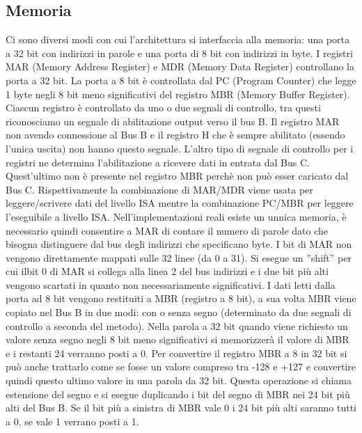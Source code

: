 \subsection{Memoria}
Ci sono diversi modi con cui l'architettura si interfaccia alla memoria: una porta a 32 bit con indirizzi in parole e una porta di 8 bit con indirizzi in byte. I registri MAR (Memory Address Register) e MDR (Memory Data Register) controllano la porta a 32 bit. La porta a 8 bit è controllata dal PC (Program Counter) che legge 1 byte negli 8 bit meno significativi del registro MBR (Memory Buffer Register).
Ciascun registro è controllato da uno o due segnali di controllo, tra questi riconosciamo un segnale di abilitazione output verso il bus B. Il registro MAR non avendo connessione al Bus B e il registro H che è sempre abilitato (essendo l'unica uscita) non hanno questo segnale. L'altro tipo di segnale di controllo per i registri ne determina l'abilitazione a ricevere dati in entrata dal Bus C. Quest'ultimo non è presente nel registro MBR perchè non può esser caricato dal Bus C. Rispettivamente la combinazione di MAR/MDR viene usata per leggere/scrivere dati del livello ISA mentre la combinazione PC/MBR per leggere l'eseguibile a livello ISA. Nell'implementazioni reali esiste un unnica memoria, è necessario quindi consentire a MAR di contare il numero di parole dato che bisogna distinguere dal bus degli indirizzi che specificano byte. I bit di MAR non vengono direttamente mappati sulle 32 linee (da 0 a 31). Si esegue un ''shift'' per cui ilbit 0 di MAR si collega alla linea 2 del bus indirizzi e i due bit più alti vengono scartati in quanto non necessariamente significativi. I dati letti dalla porta ad 8 bit vengono restituiti a MBR (registro a 8 bit), a sua volta MBR viene copiato nel Bus B in due modi: con o senza segno (determinato da due segnali di controllo a seconda del metodo). Nella parola a 32 bit quando viene richiesto un valore senza segno negli 8 bit meno significativi si memorizzerà il valore di MBR e i restanti 24 verranno posti a 0. Per convertire il registro MBR a 8 in 32 bit si può anche trattarlo come se fosse un valore compreso tra -128 e +127 e convertire quindi questo ultimo valore in una parola da 32 bit. Questa operazione si chiama estensione del segno e si esegue  duplicando i bit del segno di MBR nei 24 bit più alti del Bus B. Se il bit più a sinistra di MBR vale 0 i 24 bit più alti saranno tutti a 0, se vale 1 verrano posti a 1.
